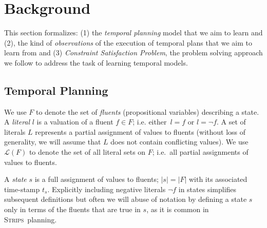 \documentclass[letterpaper]{article} %
\newcommand{\strips}{\textsc{Strips}}     %
\begin{document}
\section{Background}
\label{sec:background}
This section formalizes: (1) the {\em temporal planning} model that we aim to learn and (2), the kind of {\em observations} of the execution of temporal plans that we aim to learn from and (3) {\em Constraint Satisfaction Problem}, the problem solving approach we follow to address the task of learning temporal models.

\subsection{Temporal Planning}
We use $F$ to denote the set of {\em fluents} (propositional variables) describing a state. A {\em literal} $l$ is a valuation of a fluent $f\in F$; i.e. either~$l=f$ or $l=\neg f$. A set of literals $L$ represents a partial assignment of values to fluents (without loss of generality, we will assume that $L$ does not contain conflicting values). We use $\mathcal{L}(F)$ to denote the set of all literal sets on $F$; i.e.~all partial assignments of values to fluents.

A {\em state} $s$ is a full assignment of values to fluents; $|s|=|F|$ with its associated time-stamp $t_s$. Explicitly including negative literals $\neg f$ in states simplifies subsequent definitions but often we will abuse of notation by defining a state $s$ only in terms of the fluents that are true in $s$, as it is common in \strips\ planning.
\end{document}
